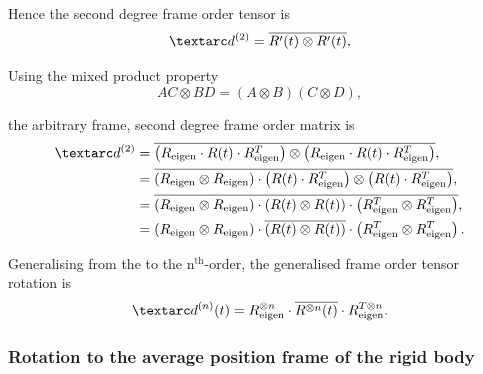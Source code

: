 Hence the second degree frame order tensor is
\begin{equation}
    \FOtwo = \overline{R'(t) \otimes R'(t)} ,
\end{equation}

Using the mixed product property
\begin{equation}
    AC \otimes BD = (A \otimes B)(C \otimes D) ,
\end{equation}

the arbitrary frame, second degree frame order matrix is
\begin{subequations}
\begin{align}
    \FOtwo &= \overline{\left( R_\textrm{eigen} \cdot R(t) \cdot R_\textrm{eigen}^T \right) \otimes \left( R_\textrm{eigen} \cdot R(t) \cdot R_\textrm{eigen}^T \right)} , \\
            &= \overline{\left(R_\textrm{eigen} \otimes R_\textrm{eigen} \right) \cdot \left( R(t) \cdot R_\textrm{eigen}^T \right) \otimes \left( R(t) \cdot R_\textrm{eigen}^T \right)} , \\
            &= \overline{\left(R_\textrm{eigen} \otimes R_\textrm{eigen} \right) \cdot \left( R(t) \otimes R(t) \right) \cdot \left( R_\textrm{eigen}^T \otimes R_\textrm{eigen}^T \right)} , \\
            &= \left(R_\textrm{eigen} \otimes R_\textrm{eigen} \right) \cdot \overline{\left( R(t) \otimes R(t) \right)} \cdot \left( R_\textrm{eigen}^T \otimes R_\textrm{eigen}^T \right) .
\end{align}
\end{subequations}

Generalising from the  to the n$^\textrm{th}$-order, the generalised frame order tensor rotation is
\begin{equation} \label{eq: frame order equation, arbitrary frame}
    \FOn(t) = R_\textrm{eigen}^{\otimes n} \cdot \overline{R^{\otimes n}(t)} \cdot R_\textrm{eigen}^{T \otimes n} .
\end{equation}





\subsubsection{Rotation to the average position frame of the rigid body}

